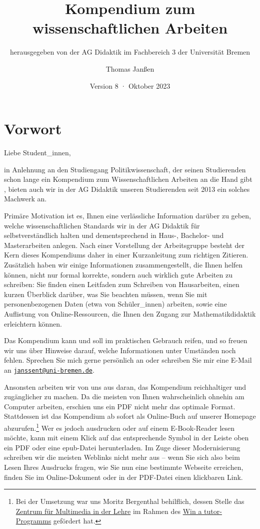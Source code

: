 \documentclass[
  bibliography=totoc,
  oneside,
  12pt,
  a4paper]{scrbook}
\title{Kompendium zum wissenschaftlichen Arbeiten}
\subtitle{herausgegeben von der AG Didaktik im Fachbereich 3 der Universität Bremen}
\author{Thomas Janßen}
\date{Version 8 · Oktober 2023}
\begin{document}
\maketitle

{
\setcounter{tocdepth}{1}
\tableofcontents
}
\hypertarget{vorwort}{%
\chapter*{Vorwort}\label{vorwort}}

Liebe Student\_innen,

in Anlehnung an den Studiengang Politikwissenschaft, der seinen Studierenden schon lange ein Kompendium zum Wissenschaftlichen Arbeiten an die Hand gibt \autocite{autorengruppe2012}, bieten auch wir in der AG Didaktik unseren Studierenden seit 2013 ein solches Machwerk an.

Primäre Motivation ist es, Ihnen eine verlässliche Information darüber zu geben, welche wissenschaftlichen Standards wir in der AG Didaktik für selbstverständlich halten und dementsprechend in Haus-, Bachelor- und Masterarbeiten anlegen. Nach einer Vorstellung der Arbeitsgruppe besteht der Kern dieses Kompendiums daher in einer Kurzanleitung zum richtigen Zitieren. Zusätzlich haben wir einige Informationen zusammengestellt, die Ihnen helfen können, nicht nur formal korrekte, sondern auch wirklich gute Arbeiten zu schreiben: Sie finden einen Leitfaden zum Schreiben von Hausarbeiten, einen kurzen Überblick darüber, was Sie beachten müssen, wenn Sie mit personenbezogenen Daten (etwa von Schüler\_innen) arbeiten, sowie eine Auflistung von Online-Ressourcen, die Ihnen den Zugang zur Mathematikdidaktik erleichtern können.

Das Kompendium kann und soll im praktischen Gebrauch reifen, und so freuen wir uns über Hinweise darauf, welche Informationen unter Umständen noch fehlen. Sprechen Sie mich gerne persönlich an oder schreiben Sie mir eine E-Mail an \href{mailto:janssent@uni-bremen.de}{\nolinkurl{janssent@uni-bremen.de}}.

Ansonsten arbeiten wir von uns aus daran, das Kompendium reichhaltiger und zugänglicher zu machen. Da die meisten von Ihnen wahrscheinlich ohnehin am Computer arbeiten, erschien uns ein PDF nicht mehr das optimale Format. Stattdessen ist das Kompendium ab sofort als Online-Buch auf unserer Homepage abzurufen.\footnote{Bei der Umsetzung war uns Moritz Bergenthal behilflich, dessen Stelle das \href{https://www.uni-bremen.de/zmml/}{Zentrum für Multimedia in der Lehre} im Rahmen des \href{https://www.uni-bremen.de/zmml/projekte/win-a-tutor-e-learning-anwendungsszenarien/}{Win a tutor-Programms} gefördert hat.} Wer es jedoch ausdrucken oder auf einem E-Book-Reader lesen möchte, kann mit einem Klick auf das entsprechende Symbol in der Leiste oben ein PDF oder eine epub-Datei herunterladen. Im Zuge dieser Modernisierung schreiben wir die meisten Weblinks nicht mehr aus -- wenn Sie sich also beim Lesen Ihres Ausdrucks fragen, wie Sie nun eine bestimmte Webseite erreichen, finden Sie im Online-Dokument oder in der PDF-Datei einen klickbaren Link.
\end{document}
